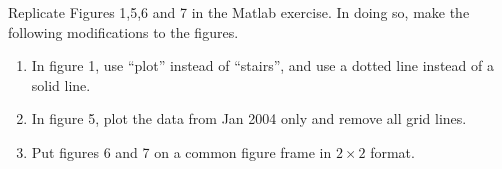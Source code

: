 \documentclass[answers]{exam}
\begin{document}
\newpage
{}
\begin{questions}
  \question
  Replicate Figures 1,5,6 and 7 in the Matlab exercise. In doing so, make the following modifications to the figures.
  \begin{enumerate}[(1)]
    \item In figure 1, use ``plot'' instead of ``stairs'', and use a dotted line instead of a solid line.
    \item In figure 5, plot the data from Jan 2004 only and remove all grid lines.
    \item Put figures 6 and 7 on a common figure frame in $2\times 2$ format.
  \end{enumerate}
  \begin{solution}


\end{solution}
\end{questions}
\end{document}
